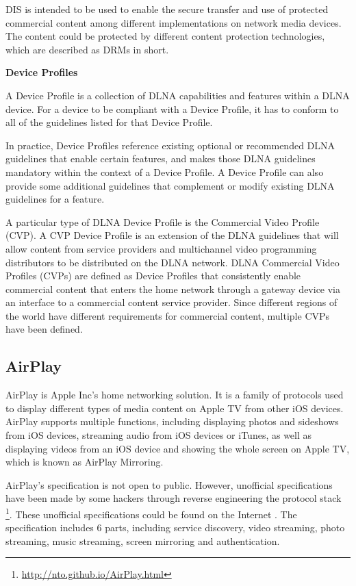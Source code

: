 DIS is intended to be used to enable the secure transfer and use of protected 
commercial content among different implementations on network media devices. 
The content could be protected by different content protection technologies, 
which are described as DRMs in short.

\textbf{Device Profiles}

A Device Profile is a collection of DLNA capabilities and features within a DLNA device. For a device 
to be compliant with a Device Profile, it has to conform to all of the guidelines listed for that 
Device Profile.

In practice, Device Profiles reference existing optional or recommended DLNA guidelines that enable certain features, and makes those DLNA guidelines mandatory within the context of a Device Profile. 
A Device Profile can also provide some additional guidelines that complement or
modify existing DLNA guidelines for a feature.

A particular type of DLNA Device Profile is the Commercial Video Profile (CVP).
A CVP Device Profile is an extension of the DLNA guidelines that will allow
content from service providers and multichannel video programming distributors
to be distributed on the DLNA network. DLNA Commercial Video Profiles (CVPs)
are defined as Device Profiles that consistently enable commercial content that
enters the home network through a gateway device via an interface to a
commercial content service provider. Since different regions of the world have
different requirements for commercial content, multiple CVPs have been defined.

\subsection{AirPlay\label{2_2_3}} 
AirPlay is Apple Inc's home networking solution. It is a family of protocols 
used to display different types of media content on Apple TV from other iOS devices. 
AirPlay supports multiple functions, including displaying photos and sideshows
from iOS devices, streaming audio from iOS devices or iTunes, as well as
displaying videos from an iOS device and showing the whole screen on Apple TV,
which is known as AirPlay Mirroring.

AirPlay's specification is not open to public. However, unofficial
specifications have been made by some hackers through reverse engineering the
protocol stack \footnote{\url{http://nto.github.io/AirPlay.html}}. These
unofficial specifications could be found on the Internet \cite{AirPlay-spec}.
The specification includes 6 parts, including service discovery, video
streaming, photo streaming, music streaming, screen mirroring and
authentication.

